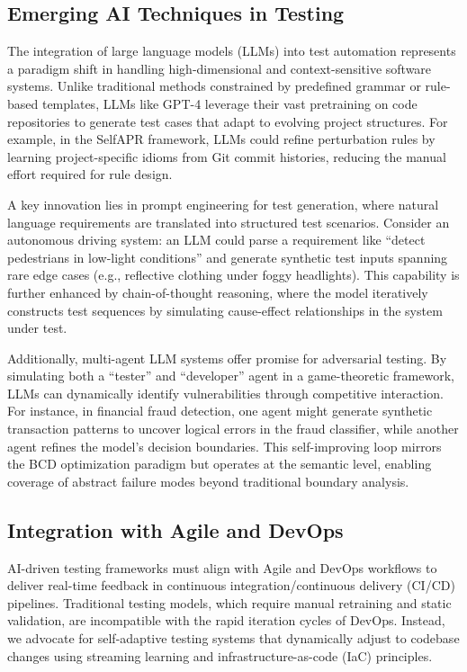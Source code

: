 \documentclass[manuscript,screen,review]{acmart}
\begin{document}
\subsection{Emerging AI Techniques in Testing}

The integration of large language models (LLMs) into test automation represents a paradigm shift in handling high-dimensional and context-sensitive software systems. Unlike traditional methods constrained by predefined grammar or rule-based templates, LLMs like GPT-4 leverage their vast pretraining on code repositories to generate test cases that adapt to evolving project structures. For example, in the SelfAPR framework, LLMs could refine perturbation rules by learning project-specific idioms from Git commit histories, reducing the manual effort required for rule design.

A key innovation lies in prompt engineering for test generation, where natural language requirements are translated into structured test scenarios. Consider an autonomous driving system: an LLM could parse a requirement like ``detect pedestrians in low-light conditions'' and generate synthetic test inputs spanning rare edge cases (e.g., reflective clothing under foggy headlights). This capability is further enhanced by chain-of-thought reasoning, where the model iteratively constructs test sequences by simulating cause-effect relationships in the system under test.

Additionally, multi-agent LLM systems offer promise for adversarial testing. By simulating both a ``tester'' and ``developer'' agent in a game-theoretic framework\cite{Li2018}, LLMs can dynamically identify vulnerabilities through competitive interaction. For instance, in financial fraud detection, one agent might generate synthetic transaction patterns to uncover logical errors in the fraud classifier, while another agent refines the model’s decision boundaries. This self-improving loop mirrors the BCD optimization paradigm but operates at the semantic level, enabling coverage of abstract failure modes beyond traditional boundary analysis.

\subsection{Integration with Agile and DevOps}

AI-driven testing frameworks must align with Agile and DevOps workflows to deliver real-time feedback in continuous integration/continuous delivery (CI/CD) pipelines. Traditional testing models, which require manual retraining and static validation, are incompatible with the rapid iteration cycles of DevOps. Instead, we advocate for self-adaptive testing systems that dynamically adjust to codebase changes using streaming learning and infrastructure-as-code (IaC) principles.
\end{document}
